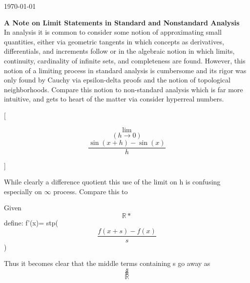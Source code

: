 \documentclass[draft]{article}
\begin{document}
\begin{flushright}
\today
\end{flushright}
\textbf{A Note on Limit Statements in Standard and Nonstandard Analysis}
\\[10pt]
In analysis it is common to consider some notion of approximating small quantities, either via geometric tangents in which concepts as derivatives, differentials, and increments follow or in the algebraic notion in which limits, continuity, cardinality of infinite sets, and completeness are found. However, this notion of a limiting process in standard analysis is cumbersome and its rigor was only found by Cauchy via epsilon-delta proofs and the notion of topological neighborhoods. Compare this notion to non-standard analysis which is far more intuitive, and gets to heart of the matter via consider hyperreal numbers. 
\begin{center}
[

$$ \lim$$ $$(h \to 0)$$ $$\frac{\sin(x+h)-\sin(x)}{h}$$

]
\end{center}
While clearly a difference quotient this use of the limit on h is confusing especially on $\infty$ process.
Compare this to
\begin{center}
Given $$\mathbb{R*}$$ define: f'(x)= stp($$\frac{f(x+s)-f(x)}{s}$$)
\end{center}
Thus it becomes clear that the middle terms containing s go away as $$s$$ $$\mathtt{e}$$ $$\mathbb{R}$$
\end{document}
